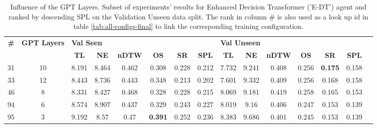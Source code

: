 \begin{table}
\centering
\caption{\label{tab:e_dt_layers}Influence of the GPT Layers. Subset of experiments' results for Enhanced Decision Transformer ('E-DT') agent and ranked by descending SPL on the Validation Unseen data split. The rank in column \# is also used as a look up id in table \ref{tab:all-configs-final} to link the corresponding training configuration.}
\begin{tabular}{@{\hskip3pt}c@{\hskip3pt}c@{\hskip3pt}c@{\hskip3pt}c@{\hskip3pt}c@{\hskip3pt}c@{\hskip3pt}c@{\hskip3pt}c@{\hskip3pt}c@{\hskip3pt}c@{\hskip3pt}c@{\hskip3pt}c@{\hskip3pt}c@{\hskip3pt}c@{\hskip3pt}c}
\toprule
\textbf{\#} & \textbf{GPT Layers} & \multicolumn{6}{l}{\textbf{Val Seen}} & \multicolumn{6}{l}{\textbf{Val Unseen}} \\
 \textbf{~} &          \textbf{~} &       \textbf{TL} & \textbf{NE} & \textbf{nDTW} &     \textbf{OS} & \textbf{SR} & \textbf{SPL} &         \textbf{TL} & \textbf{NE} & \textbf{nDTW} & \textbf{OS} &     \textbf{SR} & \textbf{SPL} \\
\midrule
         31 &                  10 &             8.191 &       8.464 &         0.462 &           0.308 &       0.228 &        0.212 &               7.732 &       9.241 &         0.408 &       0.256 &  \textbf{0.175} &        0.158 \\
         33 &                  12 &             8.443 &       8.736 &         0.443 &           0.348 &       0.213 &        0.202 &               7.601 &       9.332 &         0.409 &       0.256 &           0.168 &        0.158 \\
         46 &                   8 &             8.331 &       8.427 &         0.468 &           0.328 &       0.228 &        0.215 &               8.069 &       9.181 &         0.419 &       0.258 &           0.165 &        0.153 \\
         94 &                   6 &             8.574 &       8.907 &         0.437 &           0.329 &       0.243 &        0.227 &               8.019 &        9.16 &         0.406 &       0.247 &           0.153 &        0.139 \\
         95 &                   3 &             9.192 &        8.57 &          0.47 &  \textbf{0.391} &       0.252 &        0.236 &               8.383 &       9.686 &         0.401 &       0.245 &           0.153 &        0.139 \\
\bottomrule
\end{tabular}
\end{table}
